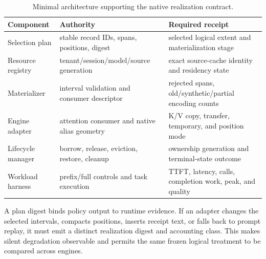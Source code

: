 \documentclass[11pt]{article}
\begin{document}
\begin{table}[H]
\centering
\small
\begin{tabularx}{\linewidth}{p{.20\linewidth}p{.33\linewidth}Y}
\toprule
Component & Authority & Required receipt \\
\midrule
Selection plan & stable record IDs, spans, positions, digest & selected logical extent and materialization stage \\
Resource registry & tenant/session/model/source generation & exact source-cache identity and residency state \\
Materializer & interval validation and consumer descriptor & rejected spans, old/synthetic/partial encoding counts \\
Engine adapter & attention consumer and native alias geometry & K/V copy, transfer, temporary, and position mode \\
Lifecycle manager & borrow, release, eviction, restore, cleanup & ownership generation and terminal-state outcome \\
Workload harness & prefix/full controls and task execution & TTFT, latency, calls, completion work, peak, and quality \\
\bottomrule
\end{tabularx}
\caption{Minimal architecture supporting the native realization contract.}
\label{tab:runtime-architecture}
\end{table}

A plan digest binds policy output to runtime evidence.  If an adapter changes
the selected intervals, compacts positions, inserts receipt text, or falls back
to prompt replay, it must emit a distinct realization digest and accounting
class.  This makes silent degradation observable and permits the same frozen
logical treatment to be compared across engines.
\end{document}
